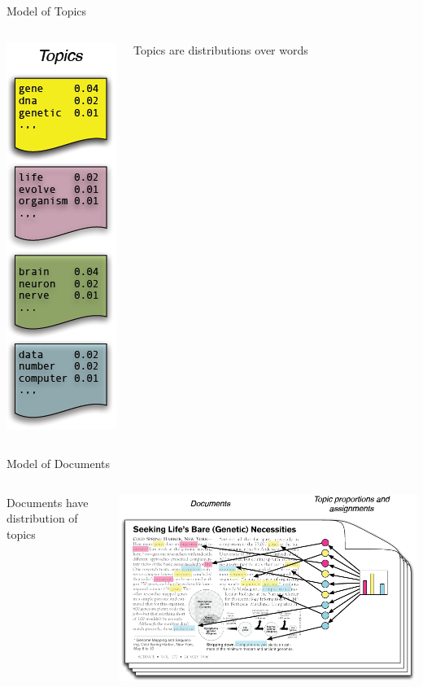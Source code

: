 \documentclass{lecture}
\begin{document}
\begin{plain}{Model of Topics}
\begin{columns}
\begin{center}
\includegraphics[scale=0.4]{figs/blei_topics}
\end{center}
\begin{center}
Topics are distributions over words
\end{center}
\end{columns}
\end{plain}

\begin{plain}{Model of Documents}
\begin{columns}
\begin{center}
Documents have distribution of topics
\end{center}
\begin{center}
\includegraphics[scale=0.3]{figs/blei_docs}
\end{center}
\end{columns}
\end{plain}
\end{document}
